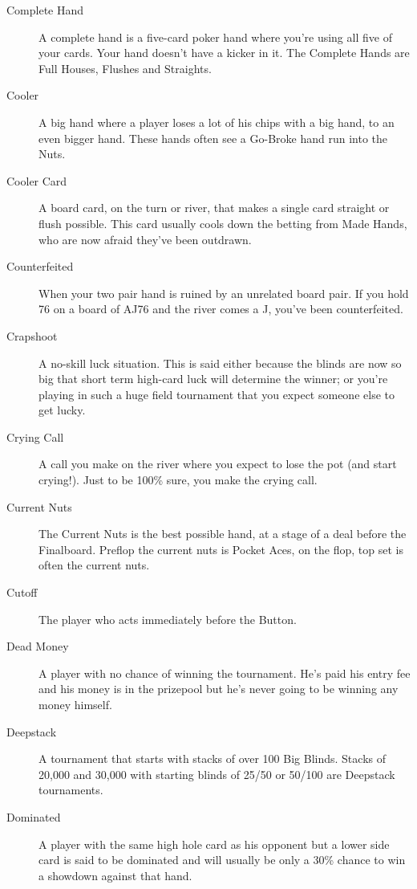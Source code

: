 \begin{description}
\item[Complete Hand] A complete hand is a five-card poker hand where
you're using all five of your cards. Your hand doesn't have a kicker
in it. The Complete Hands are Full Houses, Flushes and Straights.

\item[Cooler] A big hand where a player loses a lot of his chips with
a big hand, to an even bigger hand. These hands often see a Go-Broke
hand run into the Nuts.

\item[Cooler Card] A board card, on the turn or river, that makes a
single card straight or flush possible. This card usually cools down
the betting from Made Hands, who are now afraid they've been outdrawn.

\item[Counterfeited] When your two pair hand is ruined by an unrelated
board pair. If you hold 76 on a board of AJ76 and the river comes a J,
you've been counterfeited.

\item[Crapshoot] A no-skill luck situation. This is said either
because the blinds are now so big that short term high-card luck will
determine the winner; or you're playing in such a huge field
tournament that you expect someone else to get lucky.

\item[Crying Call] A call you make on the river where you expect to
lose the pot (and start crying!). Just to be 100\% sure, you make the
crying call.

\item[Current Nuts] The Current Nuts is the best possible hand, at a
stage of a deal before the Finalboard. Preflop the current nuts is
Pocket Aces, on the flop, top set is often the current nuts.

\item[Cutoff] The player who acts immediately before the Button.

\item[Dead Money] A player with no chance of winning the tournament.
He's paid his entry fee and his money is in the prizepool but he's
never going to be winning any money himself.

\item[Deepstack] A tournament that starts with stacks of over 100 Big
Blinds. Stacks of 20,000 and 30,000 with starting blinds of 25/50 or
50/100 are Deepstack tournaments.

\item[Dominated] A player with the same high hole card as his opponent
but a lower side card is said to be dominated and will usually be
only a 30\% chance to win a showdown against that hand.


\end{description}
